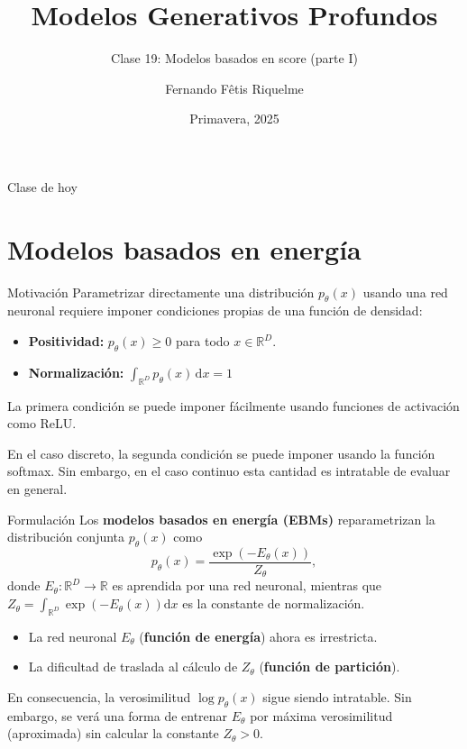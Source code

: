 \documentclass{beamer}
\title{Modelos Generativos Profundos}
\subtitle{Clase 19: Modelos basados en score (parte I)}
\author{Fernando Fêtis Riquelme}
\institute{
    Facultad de Ciencias Físicas y Matemáticas\\
    Universidad de Chile
}
\date{Primavera, 2025}
\newcommand{\R}{\mathbb{R}}
\begin{document}
\begin{frame}
    \titlepage
\end{frame}

\begin{frame}{Clase de hoy}
    \tableofcontents
\end{frame}

\section{Modelos basados en energía}

\begin{frame}{Motivación}
    Parametrizar directamente una distribución $p_\theta(x)$ usando una red neuronal requiere imponer condiciones propias de una función de densidad:
    \begin{itemize}
        \item \textbf{Positividad:} $p_\theta(x)\geq 0$ para todo $x\in\R^D$.
        \item \textbf{Normalización:} $\int_{\R^D}p_\theta(x)\,\text{d}x=1$
    \end{itemize}
    La primera condición se puede imponer fácilmente usando funciones de activación como ReLU.

    En el caso discreto, la segunda condición se puede imponer usando la función softmax. Sin embargo, en el caso continuo esta cantidad es intratable de evaluar en general.
\end{frame}

\begin{frame}{Formulación}
    Los \textbf{modelos basados en energía (EBMs)} reparametrizan la distribución conjunta $p_\theta(x)$ como
    \begin{equation*}
        p_\theta(x)=\frac{\exp\left(-E_\theta(x)\right)}{Z_\theta},
    \end{equation*}
    donde $E_\theta:\R^D\to\R$  es aprendida por una red neuronal, mientras que $Z_\theta=\int_{\R^D} \exp\left(-E_\theta(x)\right)\text{d}x$ es la constante de normalización.
    \begin{itemize}
        \item La red neuronal $E_\theta$ (\textbf{función de energía}) ahora es irrestricta.
        \item La dificultad de traslada al cálculo de $Z_\theta$ (\textbf{función de partición}).
    \end{itemize}
    En consecuencia, la verosimilitud $\log p_\theta(x)$ sigue siendo intratable. Sin embargo, se verá una forma de entrenar $E_\theta$ por máxima verosimilitud (aproximada) sin calcular la constante $Z_\theta>0$.
\end{frame}
\end{document}
